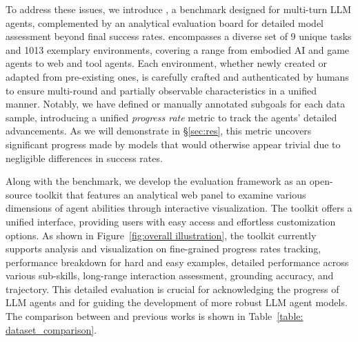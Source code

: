 To address these issues, we introduce \BenchName, a benchmark designed for multi-turn LLM agents, complemented by an analytical evaluation board for detailed model assessment beyond final success rates.
\BenchName{} encompasses a diverse set of 9 unique tasks and 1013 exemplary environments, covering a range from embodied AI and game agents to web and tool agents. 
Each environment, whether newly created or adapted from pre-existing ones, is carefully crafted and authenticated by humans to ensure multi-round and partially observable characteristics in a unified manner.
Notably, we have defined or manually annotated subgoals for each data sample, introducing a unified \emph{progress rate} metric to track the agents' detailed advancements. As we will demonstrate in \S\ref{sec:res}, this metric uncovers significant progress made by models that would otherwise appear trivial due to negligible differences in success rates. 

Along with the benchmark, we develop the \BenchName{} evaluation framework as an open-source toolkit that features an analytical web panel to examine various dimensions of agent abilities through interactive visualization. 
The toolkit offers a unified interface, providing users with easy access and effortless customization options.
As shown in Figure~\ref{fig:overall illustration}, the \BenchName{} toolkit  currently supports analysis and visualization on fine-grained progress rates tracking, performance breakdown for hard and easy examples, detailed performance across various sub-skills, long-range interaction assessment, grounding accuracy, and trajectory.
This detailed evaluation is crucial for acknowledging the progress of LLM agents and for guiding the development of more robust LLM agent models. The comparison between \BenchName{} and previous works is shown in Table~\ref{table: dataset_comparison}.



